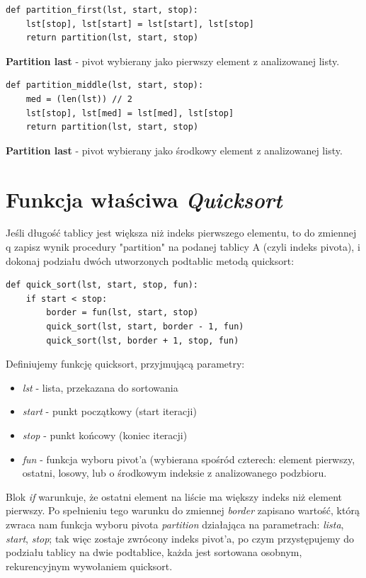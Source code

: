 \documentclass[a4paper,11pt]{report}
\begin{document}
\begin{verbatim}
def partition_first(lst, start, stop):
    lst[stop], lst[start] = lst[start], lst[stop]
    return partition(lst, start, stop)
\end{verbatim}
\textbf{Partition last} - pivot wybierany jako pierwszy element z analizowanej listy.

\begin{verbatim}
def partition_middle(lst, start, stop):
    med = (len(lst)) // 2
    lst[stop], lst[med] = lst[med], lst[stop]
    return partition(lst, start, stop)
\end{verbatim}
\textbf{Partition last} - pivot wybierany jako środkowy element z analizowanej listy.

\section{Funkcja właściwa \textit{Quicksort}}

Jeśli długość tablicy jest większa niż indeks pierwszego elementu, to do zmiennej q zapisz wynik procedury "partition" na podanej tablicy A (czyli indeks pivota), i dokonaj podziału dwóch utworzonych podtablic metodą quicksort: 

\begin{verbatim}
def quick_sort(lst, start, stop, fun):
    if start < stop:
        border = fun(lst, start, stop)
        quick_sort(lst, start, border - 1, fun)
        quick_sort(lst, border + 1, stop, fun)
\end{verbatim}

Definiujemy funkcję quicksort, przyjmującą parametry:

\begin{itemize}
\item \textit{lst} - lista, przekazana do sortowania
\item \textit{start} - punkt początkowy (start iteracji)
\item \textit{stop} - punkt końcowy (koniec iteracji)
\item \textit{fun} - funkcja wyboru pivot'a (wybierana spośród czterech: element pierwszy, ostatni, losowy, lub o środkowym indeksie z analizowanego podzbioru.
\end{itemize}

Blok \textit{if} warunkuje, że ostatni element na liście ma większy indeks niż element pierwszy. Po spełnieniu tego warunku do zmiennej \textit{border} zapisano wartość, którą zwraca nam funkcja wyboru pivota \textit{partition} działająca na parametrach: \textit{lista}, \textit{start}, \textit{stop}; tak więc zostaje zwrócony indeks pivot'a, po czym przystępujemy do podziału tablicy na dwie podtablice, każda jest sortowana osobnym, rekurencyjnym wywołaniem quicksort.
\end{document}

